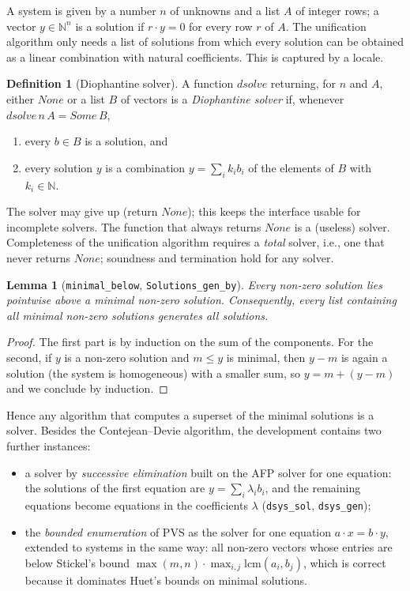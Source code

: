 \documentclass[11pt,a4paper]{article}
\newtheorem{lemma}[theorem]{Lemma}
\theoremstyle{definition}
\newtheorem{definition}[theorem]{Definition}
\theoremstyle{remark}
\newcommand{\isa}[1]{\mbox{\small\texttt{#1}}}
\newcommand{\N}{\mathbb{N}}
\begin{document}
A system is given by a number $n$ of unknowns and a list $A$ of integer rows; a vector
$y\in\N^n$ is a solution if $r\cdot y = 0$ for every row $r$ of $A$. The unification algorithm
only needs a list of solutions from which every solution can be obtained as a linear combination
with natural coefficients. This is captured by a locale.

\begin{definition}[Diophantine solver]
  A function $\mathit{dsolve}$ returning, for $n$ and $A$, either $\mathit{None}$ or a list $B$ of
  vectors is a \emph{Diophantine solver} if, whenever $\mathit{dsolve}\,n\,A = \mathit{Some}\,B$,
  \begin{enumerate}[nosep]
    \item every $b \in B$ is a solution, and
    \item every solution $y$ is a combination $y = \sum_i k_i b_i$ of the elements of $B$ with
          $k_i \in \N$.
  \end{enumerate}
\end{definition}

The solver may give up (return $\mathit{None}$); this keeps the interface usable for incomplete
solvers. The function that always returns $\mathit{None}$ is a (useless) solver. Completeness of
the unification algorithm requires a \emph{total} solver, i.e., one that never returns
$\mathit{None}$; soundness and termination hold for any solver.

\begin{lemma}[\isa{minimal\_below}, \isa{Solutions\_gen\_by}]\label{lem:minimal}
  Every non-zero solution lies pointwise above a minimal non-zero solution. Consequently, every
  list containing all minimal non-zero solutions generates all solutions.
\end{lemma}

\begin{proof}
  The first part is by induction on the sum of the components. For the second, if $y$ is a
  non-zero solution and $m \le y$ is minimal, then $y - m$ is again a solution (the system is
  homogeneous) with a smaller sum, so $y = m + (y - m)$ and we conclude by induction.
\end{proof}

Hence any algorithm that computes a superset of the minimal solutions is a solver. Besides the
Contejean--Devie algorithm, the development contains two further instances:
\begin{itemize}[nosep,leftmargin=*]
  \item a solver by \emph{successive elimination} built on the AFP solver for one equation: the
        solutions of the first equation are $y = \sum_i \lambda_i b_i$, and the remaining
        equations become equations in the coefficients $\lambda$ (\isa{dsys\_sol},
        \isa{dsys\_gen});
  \item the \emph{bounded enumeration} of PVS as the solver for one equation
        $a \cdot x = b \cdot y$, extended to systems in the same way: all non-zero vectors whose
        entries are below Stickel's bound $\max(m,n)\cdot\max_{i,j}\mathrm{lcm}(a_i, b_j)$, which
        is correct because it dominates Huet's bounds on minimal solutions.
\end{itemize}
\end{document}

